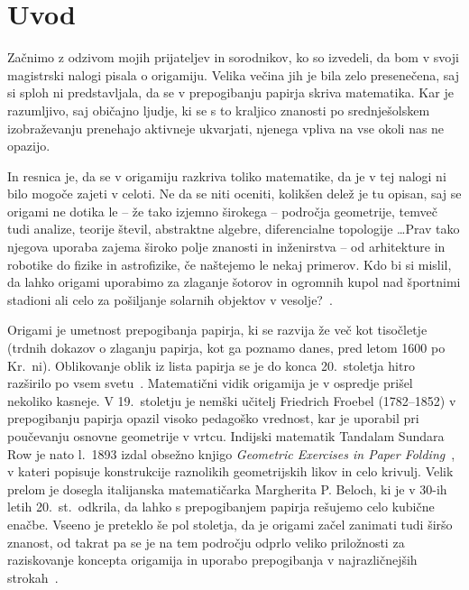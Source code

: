\section{Uvod}

Začnimo z odzivom mojih prijateljev in sorodnikov, ko so izvedeli, da bom v svoji magistrski nalogi pisala o origamiju. Velika večina jih je bila zelo presenečena, saj si sploh ni predstavljala, da se v prepogibanju papirja skriva matematika. Kar je razumljivo, saj običajno ljudje, ki se s to kraljico znanosti po srednješolskem izobraževanju prenehajo aktivneje ukvarjati, njenega vpliva na vse okoli nas ne opazijo.

In resnica je, da se v origamiju razkriva toliko matematike, da je v tej nalogi ni bilo mogoče zajeti v celoti. Ne da se niti oceniti, kolikšen delež je tu opisan, saj se origami ne dotika le -- že tako izjemno širokega -- področja geometrije, temveč tudi analize, teorije števil, abstraktne algebre, diferencialne topologije \ldots Prav tako njegova uporaba zajema široko polje znanosti in inženirstva -- od arhitekture in robotike do fizike in astrofizike, če naštejemo le nekaj primerov. Kdo bi si mislil, da lahko origami uporabimo za zlaganje šotorov in ogromnih kupol nad športnimi stadioni ali celo za pošiljanje solarnih objektov v vesolje?~\cite[str.\ 3--5]{hull2020}.

Origami je umetnost prepogibanja papirja, ki se razvija že več kot tisočletje (trdnih dokazov o zlaganju papirja, kot ga poznamo danes, pred letom 1600 po Kr.\ ni). Oblikovanje oblik iz lista papirja se je do konca 20.\ stoletja hitro razširilo po vsem svetu~\cite{robinson2024}. Matematični vidik origamija je v ospredje prišel nekoliko kasneje. V 19.\ stoletju je nemški učitelj Friedrich Froebel (1782--1852) v prepogibanju papirja opazil visoko pedagoško vrednost, kar je uporabil pri poučevanju osnovne geometrije v vrtcu. Indijski matematik Tandalam Sundara Row je nato l.\ 1893 izdal obsežno knjigo \emph{Geometric Exercises in Paper Folding}~\cite{row1917}, v kateri popisuje konstrukcije raznolikih geometrijskih likov in celo krivulj. Velik prelom je dosegla italijanska matematičarka Margherita P. Beloch, ki je v 30-ih letih 20.\ st.\ odkrila, da lahko s prepogibanjem papirja rešujemo celo kubične enačbe. Vseeno je preteklo še pol stoletja, da je origami začel zanimati tudi širšo znanost, od takrat pa se je na tem področju odprlo veliko priložnosti za raziskovanje koncepta origamija in uporabo prepogibanja v najrazličnejših strokah~\cite[str.\ 10]{hull2020}.

